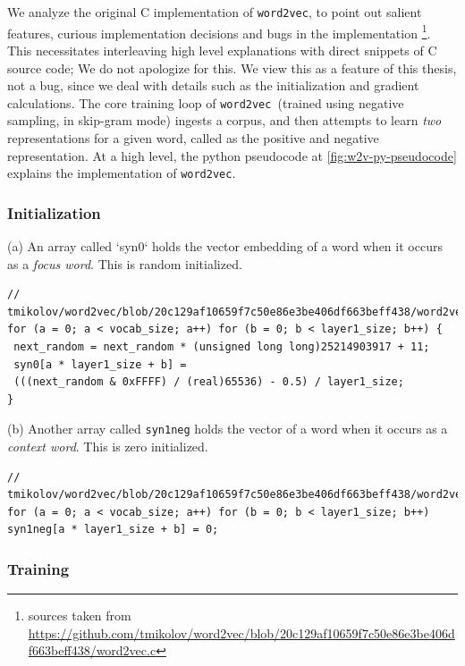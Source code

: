 \documentclass[11pt]{book}
\newcommand{\wtov}{\texttt{word2vec }}
\begin{document}
We analyze the original C implementation of \texttt{word2vec}, to point out
salient features, curious implementation decisions and bugs in the
implementation 
\footnote{sources taken from \url{https://github.com/tmikolov/word2vec/blob/20c129af10659f7c50e86e3be406df663beff438/word2vec.c}}.
This necessitates interleaving high level explanations with direct snippets of  C source code;
We do not apologize for this. We view this as a feature of this thesis, not a bug, since we deal
with details such as the initialization and gradient calculations.  The core
training loop of \wtov (trained using negative sampling, in skip-gram mode)
ingests a corpus, and then attempts to learn \emph{two} representations for a
given word, called as the positive and negative representation. At a high
level, the python pseudocode at \autoref{fig:w2v-py-pseudocode} explains the
implementation of \texttt{word2vec}.


\subsubsection{Initialization}
(a) An array called `syn0` holds the vector embedding of a word when it occurs
as a \emph{focus word}. This is random initialized.

\begin{verbatim}
// tmikolov/word2vec/blob/20c129af10659f7c50e86e3be406df663beff438/word2vec.c#L369
for (a = 0; a < vocab_size; a++) for (b = 0; b < layer1_size; b++) {
 next_random = next_random * (unsigned long long)25214903917 + 11;
 syn0[a * layer1_size + b] =
 (((next_random & 0xFFFF) / (real)65536) - 0.5) / layer1_size;
}
\end{verbatim}

(b) Another array called \texttt{syn1neg} holds the vector of a word when it occurs
as a \emph{context word}. This is zero initialized.

\begin{verbatim}
// tmikolov/word2vec/blob/20c129af10659f7c50e86e3be406df663beff438/word2vec.c#L365
for (a = 0; a < vocab_size; a++) for (b = 0; b < layer1_size; b++)
syn1neg[a * layer1_size + b] = 0;
\end{verbatim}


\subsubsection{Training}
\end{document}
